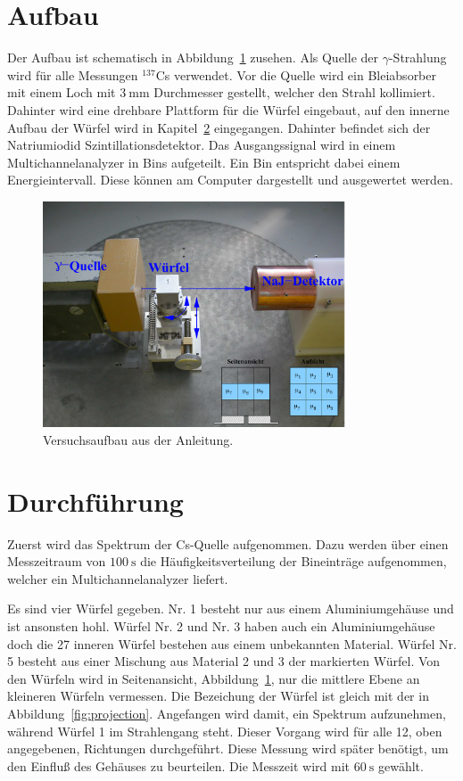 \section{Aufbau}
\label{sec:Aufbau}

Der Aufbau ist schematisch in Abbildung~\ref{fig:aufbau} zusehen.
Als Quelle der $γ$-Strahlung wird für alle Messungen ${}^{137}$Cs verwendet.
Vor die Quelle wird ein Bleiabsorber mit einem
Loch mit $\SI{3}{\milli\meter}$ Durchmesser gestellt, welcher den Strahl kollimiert.
Dahinter wird eine drehbare Plattform für die Würfel eingebaut,
auf den innerne Aufbau der Würfel wird in Kapitel~\ref{sec:durchfuehrung} eingegangen.
Dahinter befindet sich der Natriumiodid Szintillationsdetektor.
Das Ausgangssignal wird in einem Multichannelanalyzer in Bins aufgeteilt.
Ein Bin entspricht dabei einem Energieintervall.
Diese können am Computer dargestellt und ausgewertet werden.

\begin{figure}
  \centering
  \includegraphics[width=0.8\textwidth]{pdfs/aufbau_v14.png}
  \caption{Versuchsaufbau aus der Anleitung. \cite{anleitung}}
  \label{fig:aufbau}
\end{figure}

\section{Durchführung}
\label{sec:durchfuehrung}
Zuerst wird das Spektrum der Cs-Quelle aufgenommen. Dazu werden über einen
Messzeitraum von $\SI{100}{\second}$ die Häufigkeitsverteilung der Bineinträge aufgenommen, welcher
ein Multichannelanalyzer liefert.

Es sind vier Würfel gegeben. Nr. 1 besteht nur aus einem Aluminiumgehäuse
und ist ansonsten hohl. Würfel Nr. 2 und Nr. 3 haben auch ein
Aluminiumgehäuse doch die 27 inneren Würfel bestehen aus einem unbekannten
Material. Würfel Nr. 5 besteht aus einer Mischung aus Material 2 und 3 der
markierten Würfel.
Von den Würfeln wird in Seitenansicht, Abbildung~\ref{fig:aufbau},
nur die mittlere Ebene an kleineren Würfeln vermessen.
Die Bezeichung der Würfel ist gleich mit der in Abbildung~\ref{fig:projection}.
Angefangen wird damit, ein Spektrum aufzunehmen, während Würfel 1 im
Strahlengang steht. Dieser Vorgang wird für alle 12, oben angegebenen,
Richtungen durchgeführt.
Diese Messung wird später benötigt, um den Einfluß des Gehäuses zu
beurteilen.
Die Messzeit wird mit $\SI{60}{\second}$ gewählt.


